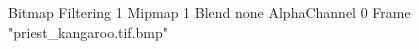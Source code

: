 {Bitmap
	{Filtering 1}
	{Mipmap 1}
	{Blend none}
	{AlphaChannel 0}
	{Frame "priest_kangaroo.tif.bmp"}
}

